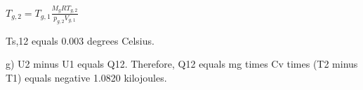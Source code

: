 \( T_{g,2} = T_{g,1} \frac{M_{g} R T_{g,2}}{p_{g,2} V_{g,1}} \)

Ts,12 equals 0.003 degrees Celsius.  

g) U2 minus U1 equals Q12.  
Therefore, Q12 equals mg times Cv times (T2 minus T1) equals negative 1.0820 kilojoules.